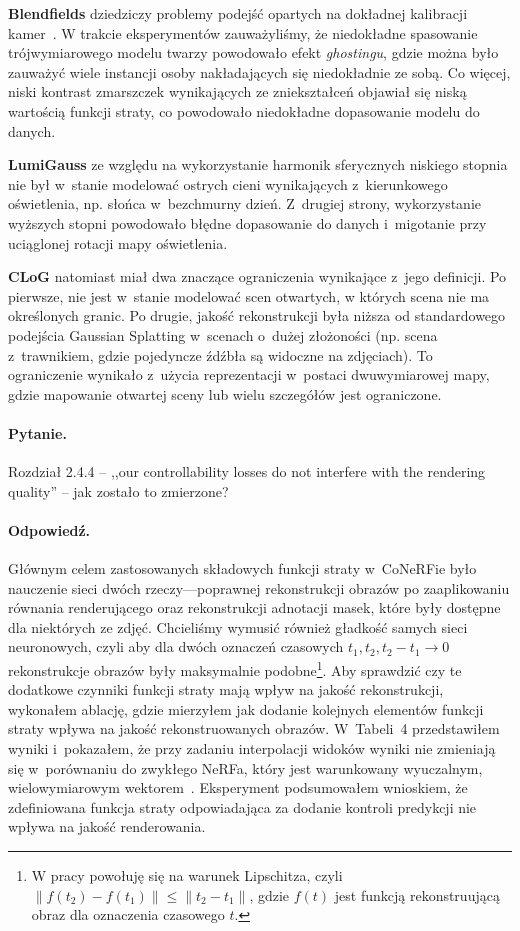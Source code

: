 \documentclass{rebuttal}
\begin{document}
  \textbf{Blendfields} dziedziczy problemy podejść opartych na dokładnej
  kalibracji kamer~\cite{garbin2024voltemorph}. W trakcie eksperymentów
  zauważyliśmy, że niedokładne spasowanie trójwymiarowego modelu twarzy
  powodowało efekt \textit{ghostingu}, gdzie można było zauważyć wiele instancji
  osoby nakładających się niedokładnie ze sobą. Co więcej, niski kontrast
  zmarszczek wynikających ze zniekształceń objawiał się niską wartością funkcji
  straty, co powodowało niedokładne dopasowanie modelu do danych.

  \textbf{LumiGauss} ze względu na wykorzystanie harmonik sferycznych niskiego
  stopnia nie był w~stanie modelować ostrych cieni wynikających z~kierunkowego
  oświetlenia, np. słońca w~bezchmurny dzień. Z~drugiej strony, wykorzystanie
  wyższych stopni powodowało błędne dopasowanie do danych i~migotanie przy
  uciąglonej rotacji mapy oświetlenia.

  \textbf{CLoG} natomiast miał dwa znaczące ograniczenia wynikające z~jego
  definicji. Po pierwsze, nie jest w~stanie modelować scen otwartych, w których
  scena nie ma określonych granic. Po drugie, jakość rekonstrukcji była niższa
  od standardowego podejścia Gaussian Splatting w~scenach o~dużej złożoności
  (np. scena z~trawnikiem, gdzie pojedyncze źdźbła są widoczne na zdjęciach). To
  ograniczenie wynikało z~użycia reprezentacji w~postaci dwuwymiarowej mapy,
  gdzie mapowanie otwartej sceny lub wielu szczegółów jest ograniczone.

  \responsedelimiter

\paragraph{Pytanie.}
  Rozdział 2.4.4 -- ,,our controllability losses do not interfere with the
  rendering quality'' -- jak zostało to zmierzone?
\paragraph{Odpowiedź.}
  Głównym celem zastosowanych składowych funkcji straty w~CoNeRFie było
  nauczenie sieci dwóch rzeczy---poprawnej rekonstrukcji obrazów po
  zaaplikowaniu równania renderującego oraz rekonstrukcji adnotacji masek, które
  były dostępne dla niektórych ze zdjęć. Chcieliśmy wymusić również gładkość
  samych sieci neuronowych, czyli aby dla dwóch oznaczeń czasowych $t_1, t_2,
    t_2 - t_1 \to 0$ rekonstrukcje obrazów były maksymalnie podobne\footnote{W
    pracy powołuję się na warunek Lipschitza, czyli $\|f(t_2) - f(t_1)\| \leq
      \|t_2 - t_1\|$, gdzie $f(t)$ jest funkcją rekonstruującą obraz dla oznaczenia
    czasowego $t$.}. Aby sprawdzić czy te dodatkowe czynniki funkcji straty mają
  wpływ na jakość rekonstrukcji, wykonałem ablację, gdzie mierzyłem jak dodanie
  kolejnych elementów funkcji straty wpływa na jakość rekonstruowanych obrazów.
  W~Tabeli~4 przedstawiłem wyniki i~pokazałem, że przy zadaniu interpolacji
  widoków wyniki nie zmieniają się w~porównaniu do zwykłego NeRFa, który jest
  warunkowany wyuczalnym, wielowymiarowym wektorem~\cite{mildenhall2020nerf}.
  Eksperyment podsumowałem wnioskiem, że zdefiniowana funkcja straty
  odpowiadająca za dodanie kontroli predykcji nie wpływa na jakość renderowania.
\end{document}
